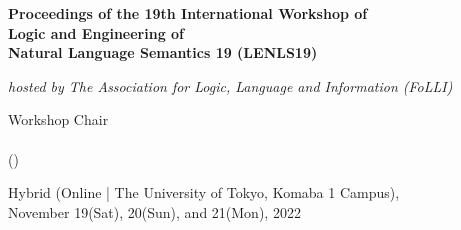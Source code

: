 \documentclass[12pt]{jarticle}
\begin{document}
\pagestyle{empty}

\vspace*{1cm}
\begin{Large}
\begin{center}
{\bf Proceedings of the 19th International Workshop of \\
     Logic and Engineering of \\Natural Language Semantics 19 (LENLS19)}
\end{center}
\end{Large}
\vspace*{1cm}
\begin{Large}
\begin{center}
{\em hosted by The Association 
for Logic, Language and Information (FoLLI)}
\end{center}
\end{Large}
\begin{large}
\vspace*{1cm}
\begin{center}
Workshop Chair\\ $\;$\\
 ()
\end{center}
\end{large}
\vspace*{3cm}
\begin{center}
\centerline{
\hspace*{30pt}
}
\end{center}
\vspace*{1cm}
\begin{large}
\begin{center}
Hybrid (Online | The University of Tokyo, Komaba 1 Campus), \\
November 19(Sat), 20(Sun), and 21(Mon), 2022
\end{center}
\end{large}
\vfill
\end{document}
